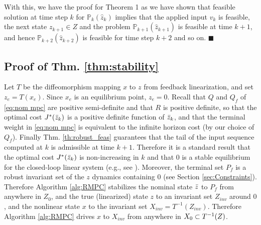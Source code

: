 With this, we have the proof for Theorem 1 as we have shown that feasible solution at time step $k$ for $\mathbb{P}_{k}(\hat{z}_{k}) $ implies that the applied input $v_k$ is feasible, the next state $z_{k+1} \in Z$ and the problem $\mathbb{P}_{k+1}(\hat{z}_{k+1}) $ is feasible at time $k+1$, and hence  $\mathbb{P}_{k+2}(\hat{z}_{k+2}) $ is feasible for time step $k+2$ and so on. $\blacksquare$


\subsection{Proof of Thm. \ref{thm:stability}}
	Let $T$ be the diffeomorphism mapping $x$ to $z$ from feedback linearization, and set $z_e = T(x_e)$. 
	Since $x_e$ is an equilibrium point, $z_e=0$.
	Recall that $Q$ and $Q_f$ of  \eqref{eq:nom mpc} are positive semi-definite and that $R$ is positive definite,  so that the optimal cost $J^*(\bar{z}_{k})$ is a positive definite function of $\bar{z}_{k}$, and that the terminal weight in \eqref{eq:nom mpc} is equivalent to the infinite horizon cost (by our choice of $Q_f$). 
	Finally Thm.  \ref{th:robust_feas} guarantees that the tail of the input sequence computed at $k$ is admissible at time $k+1$. 
	Therefore it is a standard result that the optimal cost $J^{*}({\bar{z}}_{k})$ is non-increasing in $k$ and that $0$ is a stable equilibrium for the closed-loop linear system (e.g., see \cite{CannonK15MPC} ). 
	Moreover, the terminal set $P_f$ is a robust invariant set of the $z$ dynamics containing 0 (see Section \ref{sec:Constraints}).
	Therefore Algorithm \ref{alg:RMPC} stabilizes the nominal state $\bar{z}$ to $P_f$ from anywhere in $Z_0$, and the true (linearized) state $z$ to an invariant set $Z_{inv}$ around $0$, and the nonlinear state $x$ to the invariant set $X_{inv} = T^{-1}(Z_{inv})$.
	Therefore Algorithm \ref{alg:RMPC} drives $x$ to $X_{inv}$ from anywhere in $X_0 \subset T^{-1}(Z)$.
	
